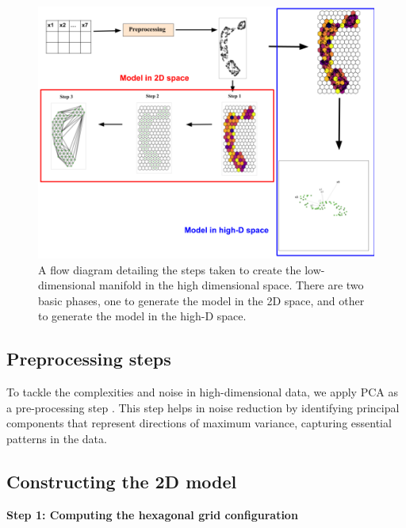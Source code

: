\documentclass[
  12pt]{article}
\begin{document}
\begin{figure}

{\centering \includegraphics[width=1\textwidth,height=1\textheight]{figures/workflow.png}

}

\caption{\label{fig-meth}A flow diagram detailing the steps taken to
create the low-dimensional manifold in the high dimensional space. There
are two basic phases, one to generate the model in the 2D space, and
other to generate the model in the high-D space.}

\end{figure}

\hypertarget{preprocessing-steps}{%
\subsection{Preprocessing steps}\label{preprocessing-steps}}

To tackle the complexities and noise in high-dimensional data, we apply
PCA as a pre-processing step \citep[\citet{article68},
\citet{article69}]{article67}. This step helps in noise reduction by
identifying principal components that represent directions of maximum
variance, capturing essential patterns in the data.

\hypertarget{constructing-the-2d-model}{%
\subsection{Constructing the 2D model}\label{constructing-the-2d-model}}

\textbf{Step 1: Computing the hexagonal grid configuration}
\end{document}
